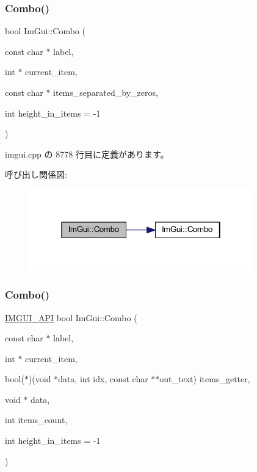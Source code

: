 \subsubsection{\texorpdfstring{Combo()}{Combo()}\hspace{0.1cm}{\footnotesize\ttfamily [2/3]}}
{\footnotesize\ttfamily bool Im\+Gui\+::\+Combo (\begin{DoxyParamCaption}\item[{const char $\ast$}]{label,  }\item[{int $\ast$}]{current\+\_\+item,  }\item[{const char $\ast$}]{items\+\_\+separated\+\_\+by\+\_\+zeros,  }\item[{int}]{height\+\_\+in\+\_\+items = {\ttfamily -\/1} }\end{DoxyParamCaption})}



 imgui.\+cpp の 8778 行目に定義があります。

呼び出し関係図\+:\nopagebreak
\begin{figure}[H]
\begin{center}
\leavevmode
\includegraphics[width=274pt]{namespace_im_gui_ae80520312b19a7039b77d2bafcbda8e5_cgraph}
\end{center}
\end{figure}
\mbox{\label{namespace_im_gui_a65d00f64f98ccb810bdb75721612948c}} 
\subsubsection{\texorpdfstring{Combo()}{Combo()}\hspace{0.1cm}{\footnotesize\ttfamily [3/3]}}
{\footnotesize\ttfamily \mbox{\hyperlink{imgui_8h_a43829975e84e45d1149597467a14bbf5}{I\+M\+G\+U\+I\+\_\+\+A\+PI}} bool Im\+Gui\+::\+Combo (\begin{DoxyParamCaption}\item[{const char $\ast$}]{label,  }\item[{int $\ast$}]{current\+\_\+item,  }\item[{bool($\ast$)(void $\ast$data, int idx, const char $\ast$$\ast$out\+\_\+text)}]{items\+\_\+getter,  }\item[{void $\ast$}]{data,  }\item[{int}]{items\+\_\+count,  }\item[{int}]{height\+\_\+in\+\_\+items = {\ttfamily -\/1} }\end{DoxyParamCaption})}

